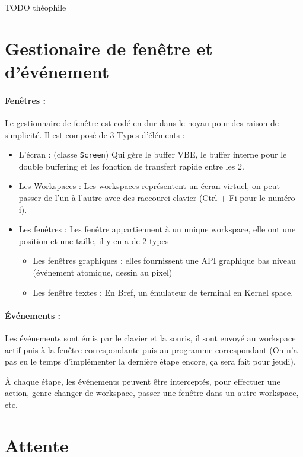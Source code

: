 \documentclass[12pt]{report}
\begin{document}
TODO théophile

\section{Gestionaire de fenêtre et d'événement}

\paragraph{Fenêtres :} Le gestionnaire de fenêtre est codé en dur dans le noyau pour des raison de
simplicité.
Il est composé de 3 Types d'éléments :
\begin{itemize}
\item L'écran : (classe \verb$Screen$) Qui gère le buffer VBE, le buffer
  interne pour le double buffering et les fonction de transfert rapide entre les
  2.
\item Les Workspaces : Les workspaces représentent un écran virtuel, on peut
  passer de l'un à l'autre avec des raccourci clavier (Ctrl + Fi pour le numéro
  i).
\item Les fenêtres : Les fenêtre appartiennent à un unique workspace, elle ont
  une position et une taille, il y en a de 2 types
  \begin{itemize}
    \item Les fenêtres graphiques : elles fournissent une API graphique bas
      niveau (événement atomique, dessin au pixel)
    \item Les fenêtre textes : En Bref, un émulateur de terminal en Kernel space.
  \end{itemize}
\end{itemize}

\paragraph{Événements :} Les événements sont émis par le clavier et la souris,
il sont envoyé au workspace actif puis à la fenêtre correspondante puis au
programme correspondant (On n'a pas eu le temps d'implémenter la dernière étape
encore, ça sera fait pour jeudi).

À chaque étape, les événements peuvent être interceptés, pour effectuer une
action, genre changer de workspace, passer une fenêtre dans un autre workspace, etc.

\section{Attente}
\end{document}
